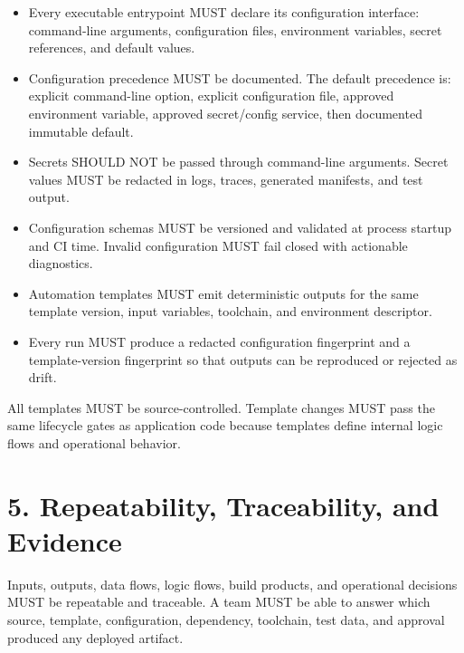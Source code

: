 \documentclass[11pt]{article}
\begin{document}
\begin{itemize}
  \item Every executable entrypoint MUST declare its configuration interface: command-line arguments, configuration files, environment variables, secret references, and default values.
  \item Configuration precedence MUST be documented. The default precedence is: explicit command-line option, explicit configuration file, approved environment variable, approved secret/config service, then documented immutable default.
  \item Secrets SHOULD NOT be passed through command-line arguments. Secret values MUST be redacted in logs, traces, generated manifests, and test output.
  \item Configuration schemas MUST be versioned and validated at process startup and CI time. Invalid configuration MUST fail closed with actionable diagnostics.
  \item Automation templates MUST emit deterministic outputs for the same template version, input variables, toolchain, and environment descriptor.
  \item Every run MUST produce a redacted configuration fingerprint and a template-version fingerprint so that outputs can be reproduced or rejected as drift.
\end{itemize}
All templates MUST be source-controlled. Template changes MUST pass the same lifecycle gates as application code because templates define internal logic flows and operational behavior.


\hypertarget{sec-repeatability-traceability}{}
\section*{5. Repeatability, Traceability, and Evidence}
Inputs, outputs, data flows, logic flows, build products, and operational decisions MUST be repeatable and traceable. A team MUST be able to answer which source, template, configuration, dependency, toolchain, test data, and approval produced any deployed artifact.
\end{document}
